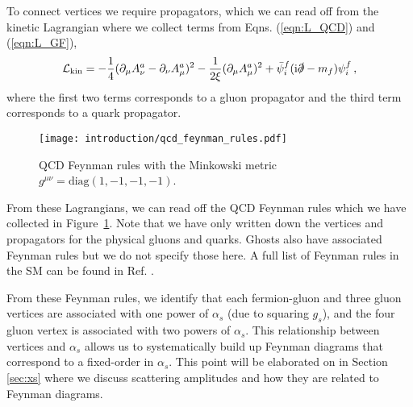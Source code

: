 \documentclass[main.tex]{subfiles}
\begin{document}
    To connect vertices we require propagators, which
    we can read off from the kinetic Lagrangian where
    we collect terms from Eqns. (\ref{eqn:L_QCD}) and (\ref{eqn:L_GF}), 
    \begin{equation}\label{L_kin}
        \mathcal{L}_{\mathrm{kin}} = -\dfrac{1}{4}(\partial_{\mu}A^{a}_{\nu}-\partial_{\nu}A^{a}_{\mu})^{2} - \dfrac{1}{2\xi}(\partial_{\mu}A^{a}_{\mu})^{2} + \bar{\psi}_{i}^{f}(\mathrm{i}\slashed{\partial}-m_{f})\psi_{i}^{f} \, ,
    \end{equation}
    where the first two terms corresponds to a gluon
    propagator and the third term corresponds to
    a quark propagator.

    \begin{figure}
        \texttt{[image: introduction/qcd\_feynman\_rules.pdf]}
        \caption{QCD Feynman rules with the Minkowski metric $g^{\mu\nu} = \mathrm{diag}(1, -1, -1, -1)$.}
        \label{fig:qcd_feynman_rules}
    \end{figure}

    From these Lagrangians, we can read off the QCD Feynman rules
    which we have collected in Figure~\ref{fig:qcd_feynman_rules}.
    Note that we have only written down the vertices and propagators
    for the physical gluons and quarks.
    Ghosts also have associated Feynman rules but we do
    not specify those here. A full list of Feynman rules
    in the SM can be found in Ref. \cite{Romao:2012pq}.

    From these Feynman rules, we identify that each
    fermion-gluon and three gluon vertices
    are associated with one power of $\alpha_{s}$ (due to squaring $g_{s}$),
    and the four gluon vertex is associated with
    two powers of $\alpha_{s}$. This relationship
    between vertices and $\alpha_{s}$ allows
    us to systematically build up Feynman diagrams
    that correspond to a fixed-order in $\alpha_{s}$.
    This point will be elaborated on in Section
    \ref{sec:xs} where we discuss scattering amplitudes
    and how they are related to Feynman diagrams.
\end{document}
